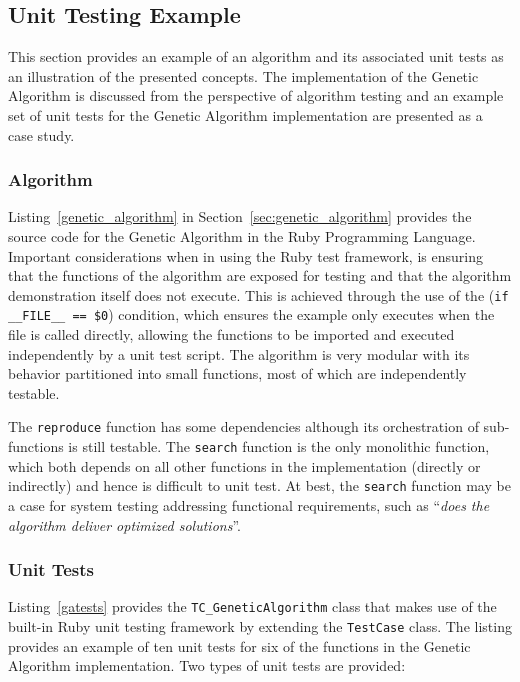 %
%
\subsection{Unit Testing Example}
\label{sec:example}
This section provides an example of an algorithm and its associated unit tests as an illustration of the presented concepts.
The implementation of the Genetic Algorithm is discussed from the perspective of algorithm testing and an example set of unit tests for the Genetic Algorithm implementation are presented as a case study.

\subsubsection{Algorithm}
\label{subsec:algorithm}
Listing~\ref{genetic_algorithm} in Section~\ref{sec:genetic_algorithm} provides the source code for the Genetic Algorithm in the Ruby Programming Language. Important considerations when in using the Ruby test framework, is ensuring that the functions of the algorithm are exposed for testing and that the algorithm demonstration itself does not execute. This is achieved through the use of the (\texttt{if \_\_FILE\_\_ == \$0}) condition, which ensures the example only executes when the file is called directly, allowing the functions to be imported and executed independently by a unit test script.
The algorithm is very modular with its behavior partitioned into small functions, most of which are independently testable. 

The \texttt{reproduce} function has some dependencies although its orchestration of sub-functions is still testable. The \texttt{search} function is the only monolithic function, which both depends on all other functions in the implementation (directly or indirectly) and hence is difficult to unit test. At best, the \texttt{search} function may be a case for system testing addressing functional requirements, such as ``\emph{does the algorithm deliver optimized solutions}''.


\subsubsection{Unit Tests}
\label{subsec:tests}
Listing~\ref{gatests} provides the \texttt{TC\_GeneticAlgorithm} class that makes use of the built-in Ruby unit testing framework by extending the \texttt{Test\-Case} class.
The listing provides an example of ten unit tests for six of the functions in the Genetic Algorithm implementation. Two types of unit tests are provided: 

